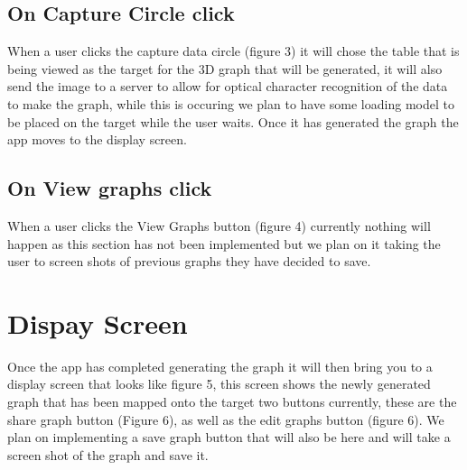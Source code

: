 \documentclass[a4paper,12pt]{article}
\begin{document}
\subsection{On Capture Circle click}
When a user clicks the capture data circle (figure 3) it will chose the table that is being viewed as the target for the 3D graph that will be generated, it will also send the image to a server to allow for optical character recognition of the data to make the graph, while this is occuring we plan to have some loading model to be placed on the target while the user waits. Once it has generated the graph the app moves to the display screen.

\subsection{On View graphs click}
When a user clicks the View Graphs button (figure 4) currently nothing will happen as this section has not been implemented but we plan on it taking the user to screen shots of previous graphs they have decided to save. 
\newpage
\section{Dispay Screen}
Once the app has completed generating the graph it will then bring you to a display screen that looks like figure 5, this screen shows the newly generated graph that has been mapped onto the target two buttons currently, these are the share graph button (Figure 6), as well as the edit graphs button (figure 6). We plan on implementing a save graph button that will also be here and will take a screen shot of the graph and save it. 
\end{document}
